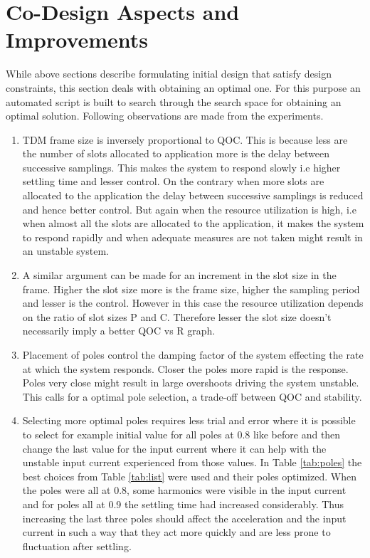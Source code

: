 \section{Co-Design Aspects and Improvements}
\label{sec:codesign}

While above sections describe formulating initial design that satisfy design constraints, this section deals with obtaining an optimal one. For this purpose an automated script is built to search through the search space for obtaining an optimal solution. Following observations are made from the experiments.

\begin{enumerate}
	\item TDM frame size is inversely proportional to QOC. This is because less are the number of slots allocated to application more is the delay between successive samplings. This makes the system to respond slowly i.e higher settling time and lesser control. On the contrary when more slots are allocated to the application the delay between successive samplings is reduced and hence better control. But again when the resource utilization is high, i.e when almost all the slots are allocated to the application, it makes the system to respond rapidly and when adequate measures are not taken might result in an unstable system.
	
	\item A similar argument can be made for an increment in the slot size in the frame. Higher the slot size more is the frame size, higher the sampling period and lesser is the control. However in this case the resource utilization depends on the ratio of slot sizes P and C. Therefore lesser the slot size  doesn't necessarily imply a better QOC vs R graph.
	
	\item Placement of poles control the damping factor of the system effecting the rate at which the system responds. Closer the poles more rapid is the response. Poles very close might result in large overshoots driving the system unstable. This calls for a optimal pole selection, a trade-off between QOC and stability.
	
		\item Selecting more optimal poles requires less trial and error where it is possible to select for example initial value for all poles at 0.8 like before and then change the last value for the input current where it can help with the unstable input current experienced from those values. In Table \ref{tab:poles} the best choices from Table \ref{tab:list} were used and their poles optimized. When the poles were all at 0.8, some harmonics were visible in the input current and for poles all at 0.9 the settling time had increased considerably. Thus increasing the last three poles should affect the acceleration and the input current in such a way that they act more quickly and are less prone to fluctuation after settling.
		

\end{enumerate}
